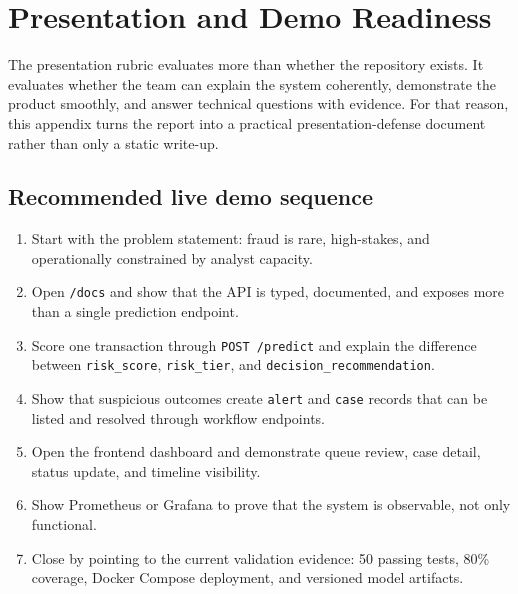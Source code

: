 \documentclass[11pt]{article}
\newcommand{\code}[1]{\texttt{#1}}
\begin{document}
\appendix
\section{Presentation and Demo Readiness}
The presentation rubric evaluates more than whether the repository exists. It evaluates whether the team can explain the system coherently, demonstrate the product smoothly, and answer technical questions with evidence. For that reason, this appendix turns the report into a practical presentation-defense document rather than only a static write-up.

\subsection*{Recommended live demo sequence}
\begin{enumerate}[leftmargin=1.5em]
  \item Start with the problem statement: fraud is rare, high-stakes, and operationally constrained by analyst capacity.
  \item Open \code{/docs} and show that the API is typed, documented, and exposes more than a single prediction endpoint.
  \item Score one transaction through \code{POST /predict} and explain the difference between \code{risk\_score}, \code{risk\_tier}, and \code{decision\_recommendation}.
  \item Show that suspicious outcomes create \code{alert} and \code{case} records that can be listed and resolved through workflow endpoints.
  \item Open the frontend dashboard and demonstrate queue review, case detail, status update, and timeline visibility.
  \item Show Prometheus or Grafana to prove that the system is observable, not only functional.
  \item Close by pointing to the current validation evidence: 50 passing tests, 80\% coverage, Docker Compose deployment, and versioned model artifacts.
\end{enumerate}
\end{document}
